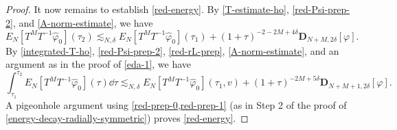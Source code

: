 \documentclass[10pt, reqno]{amsart}
\begin{document}
\begin{proof}
It now remains to establish \cref{red-energy}. By \cref{T-estimate-ho},
\cref{red-Psi-prep-2}, and \cref{A-norm-estimate}, we have
\begin{equation}\label{red-prep-0}
E_N[T^MT^{-1}\widehat{\varphi{}}_0](\tau{}_2) \lesssim_{N,\delta{}} E_N[T^MT^{-1}\widehat{\varphi{}}_0](\tau{}_1) + (1+\tau{})^{-2-2M+4\delta{}}\mathbf{D}_{N+M,2\delta{}}[\varphi{}].
\end{equation}
By \cref{integrated-T-ho}, \cref{red-Psi-prep-2}, \cref{red-rL-prep},
\cref{A-norm-estimate}, and an argument as in the proof of \cref{eda-1}, we have
\begin{equation}\label{red-prep-1}
\int_{\tau{}_1}^{\tau{}_2} E_N[T^MT^{-1}\widehat{\varphi{}}_0](\tau{})\dd{}\tau{} \lesssim_{N,\delta{}} E_N[T^MT^{-1}\widehat{\varphi{}}_0](\tau{}_1,v) + (1+\tau{})^{-2M+5\delta{}}\mathbf{D}_{N+M+1,2\delta{}}[\varphi{}].
\end{equation}
A pigeonhole argument using \cref{red-prep-0,red-prep-1} (as in Step 2 of the proof
of \cref{energy-decay-radially-symmetric}) proves \cref{red-energy}.
\end{proof}
\end{document}
